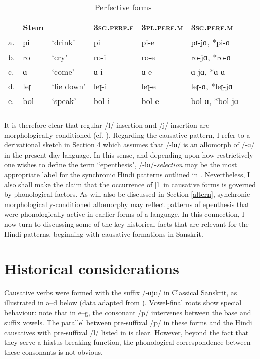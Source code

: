 \documentclass[output=paper,colorlinks,citecolor=brown]{langscibook}
\begin{document}
\begin{table}
\caption{Perfective forms}
\label{perfs}
\begin{tabularx}{\textwidth}{lQQQQl}
\lsptoprule
   & Stem & & \textsc{3sg.perf.f} & \textsc{3pl.perf.m} & \textsc{3sg.perf.m}  \\
   \midrule
a. &  pi & `drink' & pi & pi-e & pɪ-jɑ, *pi-ɑ \\
b. &  ro & `cry' & ro-i & ro-e & ro-jɑ, *ro-ɑ  \\
c. &  ɑ & `come' & ɑ-i & ɑ-e & ɑ-jɑ, *ɑ-ɑ \\
d. &  leʈ & `lie down' & leʈ-i & leʈ-e & leʈ-ɑ, *leʈ-jɑ \\
e. &  bol & `speak' & bol-i & bol-e & bol-ɑ, *bol-jɑ \\
\lspbottomrule
\end{tabularx}
\end{table}


It is therefore clear that regular /l/-insertion and /j/-insertion are morphologically conditioned (cf. \citealt{Vaux2001}).  Regarding the causative pattern, I refer to a derivational sketch in Section 4 which assumes that /-lɑ/ is an allomorph of /-ɑ/ in the present-day language.  In this sense, and depending upon how restrictively one wishes to define the term ``epenthesis", /-lɑ/-\textit{selection} may be the most appropriate label for the synchronic Hindi patterns outlined in .  Nevertheless, I also shall make the claim that the occurrence of [l] in causative forms is governed by phonological factors.  As will also be discussed in Section \ref{altern}, synchronic morphologically-conditioned allomorphy may reflect patterns of epenthesis that were phonologically active in earlier forms of a language.  In this connection, I now turn to discussing some of the key historical facts that are relevant for the Hindi patterns, beginning with causative formations in Sanskrit.

\section{Historical considerations}\label{histo}
Causative verbs were formed with the suffix /-ɑjɑ/ in Classical Sanskrit, as illustrated in a--d below (data adapted from \citealt[§129]{Mayrhofer1978}).  Vowel-final roots show special behaviour: note that in e--g, the consonant /p/ intervenes between the base and suffix vowels.  The parallel between pre-suffixal /p/ in these forms and the Hindi causatives with pre-suffixal /l/ listed in  is clear.  However, beyond the fact that they serve a hiatus-breaking function, the phonological correspondence between these consonants is not obvious.
\end{document}
